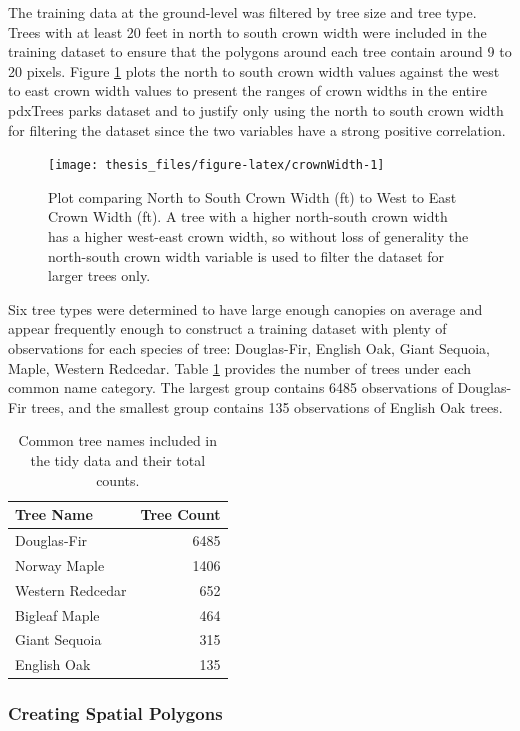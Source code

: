 \documentclass[12pt,twoside]{reedthesis}
\begin{document}
The training data at the ground-level was filtered by tree size and tree type. Trees with at least 20 feet in north to south crown width were included in the training dataset to ensure that the polygons around each tree contain around 9 to 20 pixels. Figure \ref{fig:crownWidth} plots the north to south crown width values against the west to east crown width values to present the ranges of crown widths in the entire pdxTrees parks dataset and to justify only using the north to south crown width for filtering the dataset since the two variables have a strong positive correlation.
\begin{figure}

{\centering \texttt{[image: thesis\_files/figure-latex/crownWidth-1]} 

}

\caption{Plot comparing North to South Crown Width (ft) to West to East Crown Width (ft). A tree with a higher north-south crown width has a higher west-east crown width, so without loss of generality the north-south crown width variable is used to filter the dataset for larger trees only.}\label{fig:crownWidth}
\end{figure}
Six tree types were determined to have large enough canopies on average and appear frequently enough to construct a training dataset with plenty of observations for each species of tree: Douglas-Fir, English Oak, Giant Sequoia, Maple, Western Redcedar. Table \ref{tab:pointsTable} provides the number of trees under each common name category. The largest group contains 6485 observations of Douglas-Fir trees, and the smallest group contains 135 observations of English Oak trees.
\begin{table}

\caption{\label{tab:pointsTable}Common tree names included in the tidy data and their total counts.}
\centering
\begin{tabular}[t]{l|r}
\hline
Tree Name & Tree Count\\
\hline
Douglas-Fir & 6485\\
\hline
Norway Maple & 1406\\
\hline
Western Redcedar & 652\\
\hline
Bigleaf Maple & 464\\
\hline
Giant Sequoia & 315\\
\hline
English Oak & 135\\
\hline
\end{tabular}
\end{table}
\hypertarget{creating-spatial-polygons}{%
\subsubsection{Creating Spatial Polygons}\label{creating-spatial-polygons}}
\end{document}

